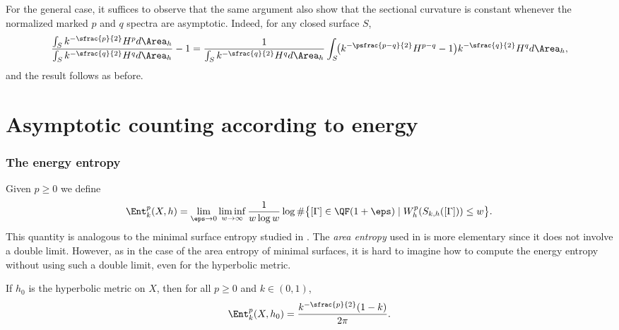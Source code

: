 For the general case, it suffices to observe that the same argument also show that the sectional curvature is constant whenever the normalized marked $p$ and $q$ spectra are asymptotic. Indeed, for any closed surface $S$,
\[
\frac{\int_S k^{-\sfrac{p}{2}}H^p d\Area_h}{\int_S k^{-\sfrac{q}{2}}H^qd\Area_h}-1
=\frac{1}{\int_Sk^{-\sfrac{q}{2}}H^qd\Area_h}\int_S\!\bigl(k^{-\psfrac{p-q}{2}}H^{p-q}-1\bigr)k^{-\sfrac{q}{2}} H^qd\Area_h,
\]
and the result follows as before.

\section{Asymptotic counting according to energy}
\subsubsection{The energy entropy} Given $p\geq 0$ we define
\begin{equation*}
\Ent^p_{k}(X,h)=\lim_{\eps\to 0}\liminf_{w\to\infty}\frac{1}{w\log w}\log\#\bigl\{[\Gamma]\in\QF(1+\eps)\mid W^{p}_{h}(S_{k,h}([\Gamma]))\leq w\bigr\}.
\end{equation*}
This quantity is analogous to the minimal surface entropy studied in \cite{CMN,ln21}. The \emph{area entropy} used in \cite{ALS} is more elementary since it does not involve a double limit. However, as in the case of the area entropy of minimal surfaces, it is hard to imagine how to compute the energy entropy without using such a double limit, even for the hyperbolic metric.

\begin{lemma} If $h_0$ is the hyperbolic metric on $X$, then for all $p\geq 0$ and $k\in(0,1)$,
\begin{equation*}
\Ent^p_{k}(X,h_0)=\frac{k^{-\sfrac{p}{2}}(1-k)}{2\pi}.
\end{equation*}
\end{lemma}

